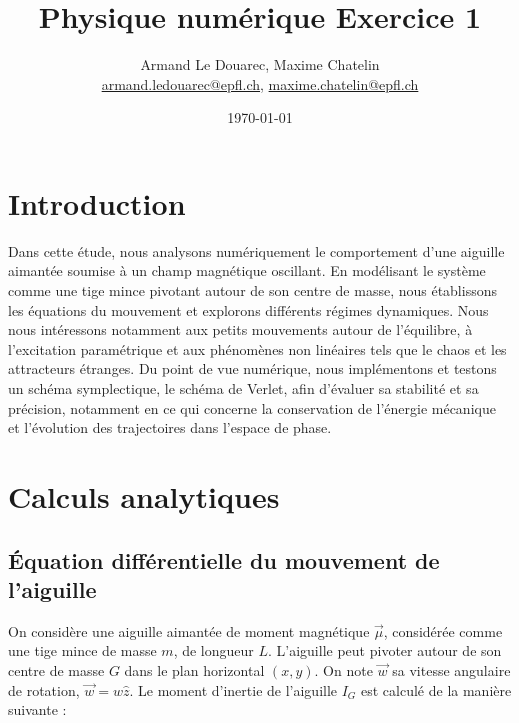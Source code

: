 \documentclass[a4paper,12pt,twoside]{article}
\newcommand{\mail}[1]{{\href{mailto:#1}{#1}}}
\begin{document}
\title{Physique numérique Exercice 1}
\author{Armand Le Douarec, Maxime Chatelin\\  %
{\small \mail{armand.ledouarec@epfl.ch}, \mail{maxime.chatelin@epfl.ch}}}
\date{\today}\maketitle
\tableofcontents %

\baselineskip=16pt
\parindent=0pt
\parskip=12pt

\section{Introduction}

Dans cette étude, nous analysons numériquement le comportement d’une aiguille aimantée soumise à un champ magnétique oscillant. En modélisant le système comme une tige mince pivotant autour de son centre de masse, nous établissons les équations du mouvement et explorons différents régimes dynamiques. Nous nous intéressons notamment aux petits mouvements autour de l’équilibre, à l’excitation paramétrique et aux phénomènes non linéaires tels que le chaos et les attracteurs étranges. Du point de vue numérique, nous implémentons et testons un schéma symplectique, le schéma de Verlet, afin d’évaluer sa stabilité et sa précision, notamment en ce qui concerne la conservation de l’énergie mécanique et l’évolution des trajectoires dans l’espace de phase.

\section{Calculs analytiques}

\subsection{Équation différentielle du mouvement de l'aiguille}

On considère une aiguille aimantée de moment magnétique $\vec{\mu}$, considérée comme une tige mince de masse $m$, de longueur $L$. L'aiguille peut pivoter autour de son centre de masse $G$ dans le plan horizontal $(x, y)$. On note $\vec{w}$ sa vitesse angulaire de rotation, $\vec{w} = w\hat{z}$. Le moment d'inertie de l'aiguille $I_G$ est calculé de la manière suivante :\\
\end{document}
